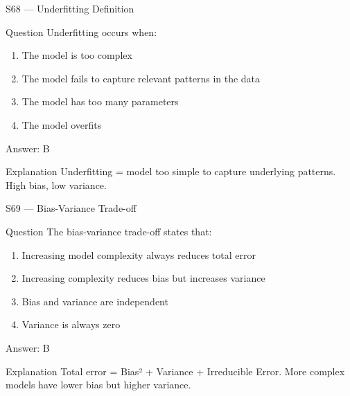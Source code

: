 \documentclass[aspectratio=169,8pt]{beamer}
\begin{document}
	\begin{frame}{S68 --- Underfitting Definition}
		\begin{block}{Question}
			Underfitting occurs when:
			\begin{enumerate}
				\item The model is too complex
				\item The model fails to capture relevant patterns in the data
				\item The model has too many parameters
				\item The model overfits
			\end{enumerate}
		\end{block}
		\begin{exampleblock}{Answer: B}\end{exampleblock}
		\begin{block}{Explanation}
			Underfitting = model too simple to capture underlying patterns. High bias, low variance.
		\end{block}
	\end{frame}
	
	\begin{frame}{S69 --- Bias-Variance Trade-off}
		\begin{block}{Question}
			The bias-variance trade-off states that:
			\begin{enumerate}
				\item Increasing model complexity always reduces total error
				\item Increasing complexity reduces bias but increases variance
				\item Bias and variance are independent
				\item Variance is always zero
			\end{enumerate}
		\end{block}
		\begin{exampleblock}{Answer: B}\end{exampleblock}
		\begin{block}{Explanation}
			Total error = Bias² + Variance + Irreducible Error. More complex models have lower bias but higher variance.
		\end{block}
	\end{frame}
	
\end{document}

